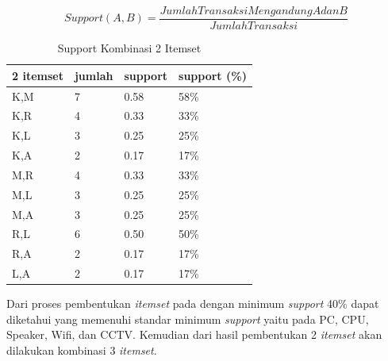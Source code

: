 \begin{enumerate}
\begin{equation}
Support (A,B) =\frac{Jumlah Transaksi Mengandung A dan B}{Jumlah Transaksi} 
\end{equation} 

\begin{table}[!ht]
\caption{Support Kombinasi 2 Itemset}
\centering
\begin{tabular}{|l|l|l|l|}
\hline
2 itemset & jumlah & support & support (\%) \\ \hline
K,M       & 7      & 0.58    & 58\%         \\ \hline
K,R       & 4      & 0.33    & 33\%         \\ \hline
K,L       & 3      & 0.25    & 25\%         \\ \hline
K,A       & 2      & 0.17    & 17\%         \\ \hline
M,R       & 4      & 0.33    & 33\%         \\ \hline
M,L       & 3      & 0.25    & 25\%         \\ \hline
M,A       & 3      & 0.25    & 25\%         \\ \hline
R,L       & 6      & 0.50    & 50\%         \\ \hline
R,A       & 2      & 0.17    & 17\%         \\ \hline
L,A       & 2      & 0.17    & 17\%         \\ \hline
\end{tabular}
\end{table}

\par Dari proses pembentukan \textit{itemset} pada dengan minimum \textit{support} 40\% dapat diketahui yang memenuhi standar minimum \textit{support} yaitu pada  PC, CPU, Speaker, Wifi, dan CCTV. Kemudian dari hasil pembentukan 2 \textit{itemset} akan dilakukan kombinasi 3 \textit{itemset}.


\end{enumerate}
